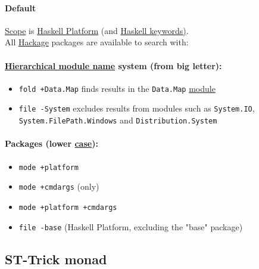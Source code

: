 \documentclass[11pt]{article}
\begin{document}
\paragraph{Default}
\label{sec:org938dc68}

\hyperref[orgb3c0d1a]{Scope} is \href{http://hackage.haskell.org/platform}{Haskell Platform} (and \href{http://haskell.org/haskellwiki/Keywords}{Haskell keywords)}.\\

All \href{http://hackage.haskell.org/}{Hackage} packages are available to search with:\\

\paragraph{\hyperref[org5a7d1d2]{Hierarchical module name} system (from big letter):}
\label{sec:org2ecb868}

\begin{itemize}
\item \texttt{fold +Data.Map} finds results in the \texttt{Data.Map} \hyperref[org5699463]{module}\\
\item \texttt{file -System} excludes results from modules such as \texttt{System.IO}, \texttt{System.FilePath.Windows} and \texttt{Distribution.System}\\
\end{itemize}

\paragraph{Packages (lower \hyperref[org41d12b6]{case}):}
\label{sec:org6e9551c}
\begin{itemize}
\item \texttt{mode +platform}\\
\item \texttt{mode +cmdargs} (only)\\
\item \texttt{mode +platform +cmdargs}\\
\item \texttt{file -base} (Haskell Platform, excluding the "base" package)\\
\end{itemize}

\subsection{\label{orgacc26e8}ST-Trick monad}
\label{sec:org1409654}
\end{document}
